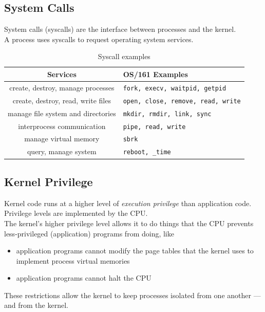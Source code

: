 \documentclass[12pt]{article}
\theoremstyle{plain}
\theoremstyle{definition}
\begin{document}
\subsection{System Calls}
System calls (syscalls) are the interface between processes and the kernel. \\
A process uses syscalls to request operating system services.
\begin{table}[H]
  \vspace{-18pt}
  \caption{Syscall examples}
  \label{tab:ex_syscall}
  \centering
  \begin{tabular}{c|l}
  Services & OS/161 Examples \\ \hline
  create, destroy, manage processes & \texttt{fork, execv, waitpid, getpid} \\
  create, destroy, read, write files & \texttt{open, close, remove, read, write} \\
  manage file system and directories & \texttt{mkdir, rmdir, link, sync} \\
  interprocess communication & \texttt{pipe, read, write} \\
  manage virtual memory & \texttt{sbrk} \\
  query, manage system & \texttt{reboot, \_time}
  \end{tabular}
\end{table}

\subsection{Kernel Privilege}
Kernel code runs at a higher level of \emph{execution privilege} than application code. \\
Privilege levels are implemented by the CPU. \\

The kernel's higher privilege level allows it to do things that the CPU prevents less-privileged (application) programs from doing, like
\begin{itemize}
  \item application programs cannot modify the page tables that the kernel uses to implement process virtual memories
  \item application programs cannot halt the CPU
\end{itemize}

These restrictions allow the kernel to keep processes isolated from one another --- and from the kernel. \\
\end{document}
